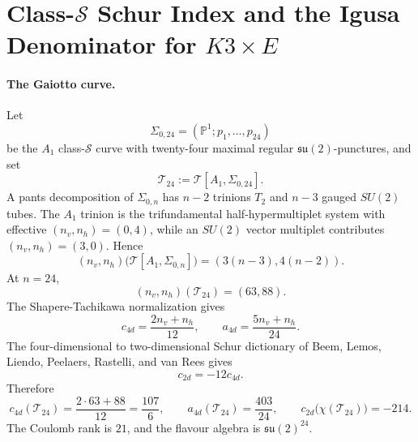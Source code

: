 \providecommand{\C}{\mathbb{C}}
\providecommand{\Z}{\mathbb{Z}}
\providecommand{\PP}{\mathbb{P}}
\providecommand{\HH}{\mathbb{H}}
\providecommand{\cI}{\mathcal{I}}
\providecommand{\cO}{\mathcal{O}}
\providecommand{\cS}{\mathcal{S}}
\providecommand{\cT}{\mathcal{T}}
\providecommand{\cV}{\mathcal{V}}
\providecommand{\Borch}{\mathrm{Borch}}
\providecommand{\ChirAlg}{\mathrm{ChirAlg}}
\providecommand{\CoHA}{\mathrm{CoHA}}
\providecommand{\Perf}{\mathrm{Perf}}
\providecommand{\SpCh}{\mathrm{Sp}^{\mathrm{ch}}}
\providecommand{\fg}{\mathfrak{g}}
\providecommand{\fgl}{\mathfrak{gl}}
\providecommand{\fsu}{\mathfrak{su}}
\providecommand{\kBKM}{\kappa_{\mathrm{BKM}}}
\providecommand{\kcat}{\kappa_{\mathrm{cat}}}
\providecommand{\kch}{\kappa_{\mathrm{ch}}}
\providecommand{\kHeis}{\kappa_{\mathrm{ch}}^{\mathrm{Heis}}}
\providecommand{\kfib}{\kappa_{\mathrm{fiber}}}
\providecommand{\PhiFA}{\Phi^{\mathrm{FA}}}
\providecommand{\Sph}{\Sigma_{0,24}}

\section*{Class-\texorpdfstring{$\cS$}{S} Schur Index and the Igusa Denominator for \texorpdfstring{$K3\times E$}{K3xE}}

\paragraph{The Gaiotto curve.}
Let
\[
  \Sph=(\PP^1;p_1,\ldots,p_{24})
\]
be the \(A_1\) class-\(\cS\) curve with twenty-four maximal regular
\(\fsu(2)\)-punctures, and set
\[
  \cT_{24}:=\cT[A_1,\Sph].
\]
A pants decomposition of \(\Sigma_{0,n}\) has \(n-2\) trinions \(T_2\)
and \(n-3\) gauged \(SU(2)\) tubes. The \(A_1\) trinion is the
trifundamental half-hypermultiplet system with effective
\((n_v,n_h)=(0,4)\), while an \(SU(2)\) vector multiplet contributes
\((n_v,n_h)=(3,0)\). Hence
\[
  (n_v,n_h)\bigl(\cT[A_1,\Sigma_{0,n}]\bigr)
  =
  (3(n-3),4(n-2)).
\]
At \(n=24\),
\[
  (n_v,n_h)(\cT_{24})=(63,88).
\]
The Shapere-Tachikawa normalization gives
\[
  c_{4d}=\frac{2n_v+n_h}{12},
  \qquad
  a_{4d}=\frac{5n_v+n_h}{24}.
\]
The four-dimensional to two-dimensional Schur dictionary of Beem,
Lemos, Liendo, Peelaers, Rastelli, and van Rees gives
\[
  c_{2d}=-12c_{4d}.
\]
Therefore
\[
  c_{4d}(\cT_{24})=\frac{2\cdot63+88}{12}=\frac{107}{6},
  \qquad
  a_{4d}(\cT_{24})=\frac{403}{24},
  \qquad
  c_{2d}\bigl(\chi(\cT_{24})\bigr)=-214.
\]
The Coulomb rank is \(21\), and the flavour algebra is
\(\fsu(2)^{24}\).

